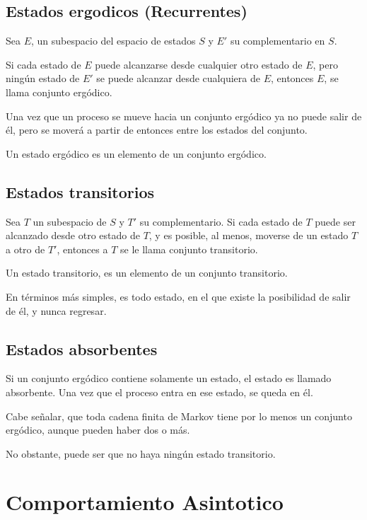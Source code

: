 \documentclass{article}
\begin{document}
\subsection*{Estados ergodicos (Recurrentes)}

Sea \( E \), un subespacio del espacio de estados \( S \) y \( E' \) su complementario en \( S \).

Si cada estado de \( E \) puede alcanzarse desde cualquier otro estado de \( E \), pero ningún estado de \( E' \) se puede alcanzar desde cualquiera de \( E \), entonces \( E \), se llama conjunto ergódico.

Una vez que un proceso se mueve hacia un conjunto ergódico ya no puede salir de él, pero se moverá a partir de entonces entre los estados del conjunto.

Un estado ergódico es un elemento de un conjunto ergódico.

\subsection*{Estados transitorios}

Sea \( T \) un subespacio de \( S \) y \( T' \) su complementario. Si cada estado de \( T \) puede ser alcanzado desde otro estado de \( T \), y es posible, al menos, moverse de un estado \( T \) a otro de \( T' \), entonces a \( T \) se le llama conjunto transitorio.

Un estado transitorio, es un elemento de un conjunto transitorio.

En términos más simples, es todo estado, en el que existe la posibilidad de salir de él, y nunca regresar.

\subsection*{Estados absorbentes}

Si un conjunto ergódico contiene solamente un estado, el estado es llamado absorbente. Una vez que el proceso entra en ese estado, se queda en él.

Cabe señalar, que toda cadena finita de Markov tiene por lo menos un conjunto ergódico, aunque pueden haber dos o más.

No obstante, puede ser que no haya ningún estado transitorio.

\section{Comportamiento Asintotico}
\end{document}
